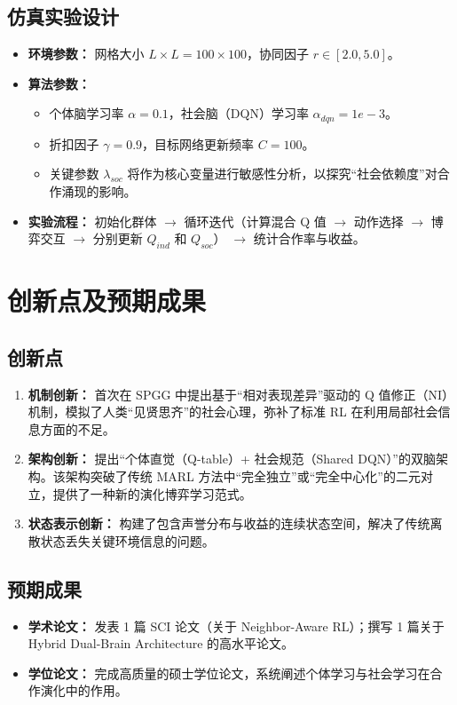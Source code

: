 \documentclass[UTF8,a4paper,12pt]{ctexart}
\begin{document}
\subsection{仿真实验设计}
\begin{itemize}
    \item \textbf{环境参数：} 网格大小 $L \times L = 100 \times 100$，协同因子 $r \in [2.0, 5.0]$。
    \item \textbf{算法参数：} 
    \begin{itemize}
        \item 个体脑学习率 $\alpha=0.1$，社会脑（DQN）学习率 $\alpha_{dqn}=1e-3$。
        \item 折扣因子 $\gamma=0.9$，目标网络更新频率 $C=100$。
        \item 关键参数 $\lambda_{soc}$ 将作为核心变量进行敏感性分析，以探究“社会依赖度”对合作涌现的影响。
    \end{itemize}
    \item \textbf{实验流程：} 初始化群体 $\rightarrow$ 循环迭代（计算混合 Q 值 $\rightarrow$ 动作选择 $\rightarrow$ 博弈交互 $\rightarrow$ 分别更新 $Q_{ind}$ 和 $Q_{soc}$） $\rightarrow$ 统计合作率与收益。
\end{itemize}
\section{创新点及预期成果}

\subsection{创新点}
\begin{enumerate}
    \item \textbf{机制创新：} 首次在 SPGG 中提出基于“相对表现差异”驱动的 Q 值修正（NI）机制，模拟了人类“见贤思齐”的社会心理，弥补了标准 RL 在利用局部社会信息方面的不足。
    \item \textbf{架构创新：} 提出“个体直觉（Q-table）+ 社会规范（Shared DQN）”的双脑架构。该架构突破了传统 MARL 方法中“完全独立”或“完全中心化”的二元对立，提供了一种新的演化博弈学习范式。
    \item \textbf{状态表示创新：} 构建了包含声誉分布与收益的连续状态空间，解决了传统离散状态丢失关键环境信息的问题。
\end{enumerate}

\subsection{预期成果}
\begin{itemize}
    \item \textbf{学术论文：} 发表 1 篇 SCI 论文（关于 Neighbor-Aware RL）；撰写 1 篇关于 Hybrid Dual-Brain Architecture 的高水平论文。
    \item \textbf{学位论文：} 完成高质量的硕士学位论文，系统阐述个体学习与社会学习在合作演化中的作用。
\end{itemize}
\end{document}
